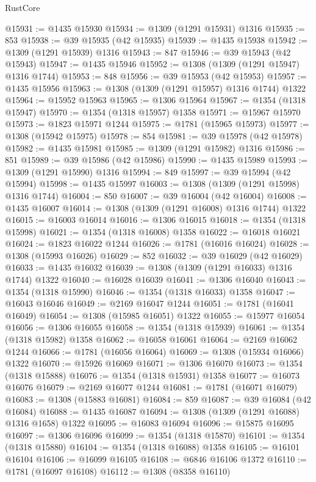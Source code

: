 \begin{lexlean}{RustCore}
\begin{coremodule}
@15931 := @1435 @15930
@15934 := @1309 (@1291 @15931) @1316
@15935 := 853
@15938 := @39 @15935 (@42 @15935)
@15939 := @1435 @15938
@15942 := @1309 (@1291 @15939) @1316
@15943 := 847
@15946 := @39 @15943 (@42 @15943)
@15947 := @1435 @15946
@15952 := @1308 (@1309 (@1291 @15947) @1316 @1744)
@15953 := 848
@15956 := @39 @15953 (@42 @15953)
@15957 := @1435 @15956
@15963 := @1308 (@1309 (@1291 @15957) @1316 @1744) @1322
@15964 := @15952 @15963
@15965 := @1306 @15964
@15967 := @1354 (@1318 @15947)
@15970 := @1354 (@1318 @15957) @1358
@15971 := @15967 @15970
@15973 := @1823 @15971 @1244
@15975 := @1781 (@15965 @15973)
@15977 := @1308 (@15942 @15975)
@15978 := 854
@15981 := @39 @15978 (@42 @15978)
@15982 := @1435 @15981
@15985 := @1309 (@1291 @15982) @1316
@15986 := 851
@15989 := @39 @15986 (@42 @15986)
@15990 := @1435 @15989
@15993 := @1309 (@1291 @15990) @1316
@15994 := 849
@15997 := @39 @15994 (@42 @15994)
@15998 := @1435 @15997
@16003 := @1308 (@1309 (@1291 @15998) @1316 @1744)
@16004 := 850
@16007 := @39 @16004 (@42 @16004)
@16008 := @1435 @16007
@16014 := @1308 (@1309 (@1291 @16008) @1316 @1744) @1322
@16015 := @16003 @16014
@16016 := @1306 @16015
@16018 := @1354 (@1318 @15998)
@16021 := @1354 (@1318 @16008) @1358
@16022 := @16018 @16021
@16024 := @1823 @16022 @1244
@16026 := @1781 (@16016 @16024)
@16028 := @1308 (@15993 @16026)
@16029 := 852
@16032 := @39 @16029 (@42 @16029)
@16033 := @1435 @16032
@16039 := @1308 (@1309 (@1291 @16033) @1316 @1744) @1322
@16040 := @16028 @16039
@16041 := @1306 @16040
@16043 := @1354 (@1318 @15990)
@16046 := @1354 (@1318 @16033) @1358
@16047 := @16043 @16046
@16049 := @2169 @16047 @1244
@16051 := @1781 (@16041 @16049)
@16054 := @1308 (@15985 @16051) @1322
@16055 := @15977 @16054
@16056 := @1306 @16055
@16058 := @1354 (@1318 @15939)
@16061 := @1354 (@1318 @15982) @1358
@16062 := @16058 @16061
@16064 := @2169 @16062 @1244
@16066 := @1781 (@16056 @16064)
@16069 := @1308 (@15934 @16066) @1322
@16070 := @15926 @16069
@16071 := @1306 @16070
@16073 := @1354 (@1318 @15888)
@16076 := @1354 (@1318 @15931) @1358
@16077 := @16073 @16076
@16079 := @2169 @16077 @1244
@16081 := @1781 (@16071 @16079)
@16083 := @1308 (@15883 @16081)
@16084 := 859
@16087 := @39 @16084 (@42 @16084)
@16088 := @1435 @16087
@16094 := @1308 (@1309 (@1291 @16088) @1316 @1658) @1322
@16095 := @16083 @16094
@16096 := @15875 @16095
@16097 := @1306 @16096
@16099 := @1354 (@1318 @15870)
@16101 := @1354 (@1318 @15880)
@16104 := @1354 (@1318 @16088) @1358
@16105 := @16101 @16104
@16106 := @16099 @16105
@16108 := @6846 @16106 @1372
@16110 := @1781 (@16097 @16108)
@16112 := @1308 (@8358 @16110)

\end{coremodule}
\end{lexlean}
